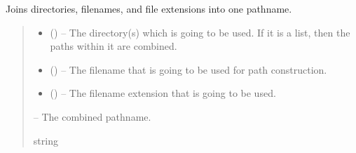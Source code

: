 \documentclass[letterpaper,11pt,english]{sphinxmanual}
\begin{document}

\begin{savenotes}\begin{fulllineitems}
\label{\detokenize{code/opihiexarata.library.path:opihiexarata.library.path.merge_pathname}}
\pysigstartsignatures
{}
\pysigstopsignatures
\sphinxAtStartPar
Joins directories, filenames, and file extensions into one pathname.
\begin{quote}\begin{description}
\begin{itemize}
\item {} 
\sphinxAtStartPar
{} (\sphinxstyleliteralemphasis{\sphinxupquote{, }}) – The directory(s) which is going to be used. If it is a list,
then the paths within it are combined.

\item {} 
\sphinxAtStartPar
{} (\sphinxstyleliteralemphasis{\sphinxupquote{, }}) – The filename that is going to be used for path construction.

\item {} 
\sphinxAtStartPar
{} (\sphinxstyleliteralemphasis{\sphinxupquote{, }}) – The filename extension that is going to be used.

\end{itemize}

\sphinxAtStartPar
{} – The combined pathname.

\sphinxAtStartPar
string

\end{description}\end{quote}

\end{fulllineitems}\end{savenotes}
\end{document}
